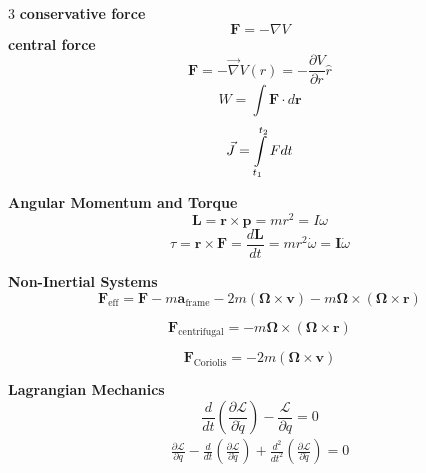 \documentclass[1pt]{article}
\begin{document}
\begin{multicols}{3}
\textbf{conservative force}
\begin{equation*}
     \mathbf{F} = -\nabla V
\end{equation*}
\textbf{central force}
\begin{equation*}
    \mathbf{F} =-\vec{\nabla} V(r)=-\frac{\partial V}{\partial r} \hat{r}
\end{equation*}
\begin{equation*}
    W = \int \mathbf{F} \cdot d\mathbf{r}
\end{equation*}
\[\vec{J}=\intop_{t_{1}}^{t_{2}}Fdt\]

\textbf{Angular Momentum and Torque}
\begin{equation*}
    \mathbf{L} = \mathbf{r} \times \mathbf{p}=mr^2=I\omega
\end{equation*}
\begin{equation*}
    \tau= \mathbf{r} \times \mathbf{F} = \frac{d\mathbf{L}}{dt}=mr^{2}\dot{\omega}=\mathbf{I}\dot{\omega}
\end{equation*}

\textbf{Non-Inertial Systems}
\begin{equation*}
    \mathbf{F}_{\text{eff}} = \mathbf{F} - m \mathbf{a}_{\text{frame}} - 2m (\mathbf{\Omega} \times \mathbf{v}) - m \mathbf{\Omega} \times (\mathbf{\Omega} \times \mathbf{r})
\end{equation*}

\begin{equation*}
    \mathbf{F}_{\text{centrifugal}} = -m \mathbf{\Omega} \times (\mathbf{\Omega} \times \mathbf{r})
\end{equation*}

\begin{equation*}
    \mathbf{F}_{\text{Coriolis}} = -2m (\mathbf{\Omega} \times \mathbf{v})
\end{equation*}

\textbf{Lagrangian Mechanics}
 \begin{equation*}
    \frac{d}{dt} \left( \frac{\partial \mathcal{L}}{\partial \dot{q}} \right) - \frac{\mathcal{L}}{\partial q} = 0
\end{equation*}
\begin{align*}
    {\frac{\partial \mathcal{\mathcal{L}}}{\partial q}}-{\frac{d}{d t}}\left({\frac{\partial \mathcal{L}}{\partial{\dot{q}}}}\right)+{\frac{d^{2}}{d t^{2}}}\left({\frac{\partial \mathcal{L}}{\partial{\ddot{q}}}}\right)=0
\end{align*}


\end{multicols}
\end{document}
